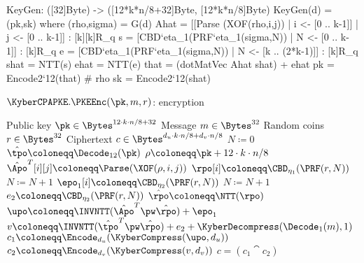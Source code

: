 \begin{code}
  KeyGen: ([32]Byte) -> ([12*k*n/8+32]Byte, [12*k*n/8]Byte)
  KeyGen(d) = (pk,sk) where
    (rho,sigma) = G(d)
    Ahat = [[Parse (XOF(rho,i,j)) | i <- [0 .. k-1]] | j <- [0 .. k-1]] : [k][k]R_q
    s = [CBD`{eta_1}(PRF`{eta_1}(sigma,N)) | N <- [0 .. k-1]] : [k]R_q
    e = [CBD`{eta_1}(PRF`{eta_1}(sigma,N)) | N <- [k .. (2*k-1)]] : [k]R_q
    shat = NTT(s)
    ehat = NTT(e)
    that = (dotMatVec Ahat shat) + ehat
    pk = Encode2`{12}(that) # rho
    sk = Encode2`{12}(shat)
\end{code}

\begin{algorithm}
  \caption{$\KyberCPAPKE.\PKEEnc(\pk, m, r)$: encryption
  \label{kybercpa-enc}}
  \begin{algorithmic}[1]
    \Require Public key $\pk \in \Bytes^{12\cdot k\cdot n/8 + 32}$
    \Require Message $m \in \Bytes^{32}$
    \Require Random coins $r \in \Bytes^{32}$
    \Ensure Ciphertext $c \in \Bytes^{d_u\cdot k\cdot n/8 + d_v\cdot n/8}$
    \State $N \coloneqq 0$
    \State $\hat{\tpo} \coloneqq \Decode_{12}(\pk)$
    \State $\rho \coloneqq \pk+12\cdot k\cdot n/8$
               
      \State $\hat{\Apo}^T[i][j] \coloneqq \Parse(\XOF(\rho, i, j))$     
    \EndFor
    \EndFor
    \label{line:kybercpa-enc:rpo}       
      \State $\rpo[i] \coloneqq \CBD_{\eta_1}(\PRF(r, N))$
      \State $N \coloneqq N+1$
    \EndFor
    \label{line:kybercpa-enc:epo}       
      \State $\epo_1[i] \coloneqq \CBD_{\eta_2}(\PRF(r, N))$
      \State $N \coloneqq N+1$
    \EndFor
    \State $e_2 \coloneqq \CBD_{\eta_2}(\PRF(r, N))$                 
    \State $\hat{\rpo} \coloneqq \NTT(\rpo)$\label{line:kybercpa-enc:nttr}
    \State $\upo \coloneqq \INVNTT(\hat{\Apo}^T \pw \hat{\rpo}) + \epo_1$\label{line:kybercpa-enc:invnttar} 
    \State $v \coloneqq \INVNTT(\hat{\tpo}^T\pw\hat{\rpo}) + e_2 + \KyberDecompress(\Decode_1(m),1)$ \label{line:kybercpa-enc:v} 
    \State $c_1 \coloneqq \Encode_{d_u}(\KyberCompress(\upo, d_u))$
    \State $c_2 \coloneqq \Encode_{d_v}(\KyberCompress(v, d_v))$
    \State \Return $c = (c_1\cat c_2)$ 
  \end{algorithmic}
\end{algorithm}

